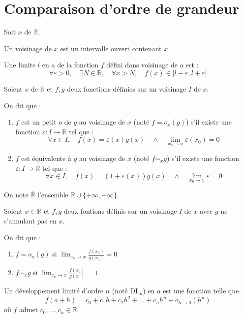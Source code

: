 \documentclass[a4paper, titlepage]{article}
\begin{document}
	\section{Comparaison d'ordre de grandeur}
	\begin{defn}
		Soit $x$ de $\mathbb{R}$.

		Un voisinage de $x$ est un intervalle ouvert contenant $x$.
	\end{defn}
	\begin{defn}
		Une limite $l$ en $a$ de la fonction $f$ défini dans voisinage de $a$ est :
		$$ \forall \varepsilon>0,\quad\exists N\in\mathbb{R},\quad \forall x>N,\quad f(x)\in]l-\varepsilon,l+\varepsilon[ $$
	\end{defn}
	\begin{defn}
		Soient $x$ de $\mathbb{R}$ et $f,g$ deux fonctions définies sur un voisinage $I$ de $x$.

		On dit que :
		\begin{enumerate}
			\item $f$ est un petit $o$ de $g$ au voisinage de $x$ (noté $f=o_x(g)$) s'il existe une fonction $\varepsilon:I\to \mathbb{R}$ tel que :
				$$ \forall x\in I,\quad f(x)=\varepsilon(x)g(x)\quad\land\quad \lim_{x_0 \to x} \varepsilon(x_0) = 0 $$
			\item $f$ est équivalente à $g$ au voisinage de $x$ (noté $f\sim_x g$) s'il existe une fonction $\varepsilon:I\to \mathbb{R}$ tel que :
				$$ \forall x\in I,\quad f(x)=(1+\varepsilon(x))g(x)\quad\land\quad \lim_{x_0 \to x} \varepsilon = 0 $$
		\end{enumerate}
	\end{defn}
	On note $\overline{\mathbb{R}}$ l'ensemble $\mathbb{R}\cup\{+\infty,-\infty\}$.
	\begin{thm}
		Soient $x\in\overline{\mathbb{R}}$ et $f,g$ deux fontions définis sur un voisinage $I$ de $x$ avec $g$ ne s'annulant pas en $x$.

		On dit que :
		\begin{enumerate}
			\item $f=o_x(g)$ si $\lim_{x_0 \to x} \frac{f(x_0)}{g(x_0)}=0$
			\item $f\sim_x g$ si $\lim_{x_0 \to x} \frac{f(x_0)}{g(x_0)}=1$
		\end{enumerate}
	\end{thm}
	\begin{defn}
		Un développement limité d'ordre $n$ (noté DL$_n$) en $a$ est une fonction telle que
		$$ f(a+h) = c_0+c_1h+c_2h^2+\ldots+c_nh^n+o_{h\to 0}(h^n) $$
		où $f$ admet $c_0,\ldots,c_n\in\mathbb{R}$.
	\end{defn}
\end{document}
